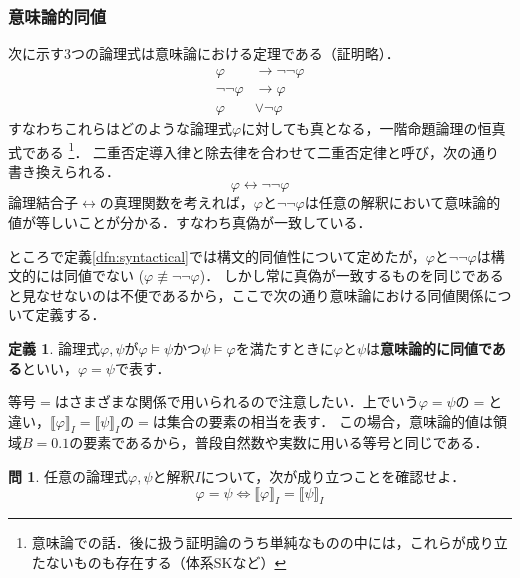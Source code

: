 \documentclass[uplatex,a4paper,dvipdfmx]{jsarticle}
\newcommand{\semvalue}[1]{\llbracket {#1} \rrbracket}
\theoremstyle{definition}
\newtheorem{dfn}{定義}
\newtheorem{question}{問}
\begin{document}
            \subsubsection{意味論的同値}
                次に示す3つの論理式は意味論における定理である（証明略）．
                \begin{align}
                    \varphi & \to  \lnot\lnot \varphi \tag{二重否定導入律} \\
                    \lnot\lnot\varphi &\to \varphi \tag{二重否定除去律} \\
                    \varphi &\lor \lnot\varphi \tag{排中律}
                \end{align}
                すなわちこれらはどのような論理式$\varphi$に対しても真となる，一階命題論理の恒真式である
                \footnote{意味論での話．後に扱う証明論のうち単純なものの中には，これらが成り立たないものも存在する（体系SKなど）}．
                二重否定導入律と除去律を合わせて二重否定律と呼び，次の通り書き換えられる．
                \begin{equation}
                    \varphi \leftrightarrow \lnot\lnot \varphi \tag{二重否定律}
                \end{equation}
                論理結合子$\leftrightarrow$の真理関数を考えれば，$\varphi$と$\lnot\lnot\varphi$は任意の解釈において意味論的値が等しいことが分かる．すなわち真偽が一致している．

                ところで定義\ref{dfn:syntactical}では構文的同値性について定めたが，$\varphi$と$\lnot\lnot\varphi$は構文的には同値でない ($\varphi \not\equiv \lnot\lnot \varphi$)．
                しかし常に真偽が一致するものを同じであると見なせないのは不便であるから，ここで次の通り意味論における同値関係について定義する．
                \begin{dfn}
                    論理式$\varphi, \psi$が$\varphi \vDash \psi$かつ$\psi \vDash \varphi$を満たすときに$\varphi$と$\psi$は\textbf{意味論的に同値である}といい，$\varphi = \psi$で表す．
                \end{dfn}

                等号$=$はさまざまな関係で用いられるので注意したい．上でいう$\varphi = \psi$の$=$と違い，$\semvalue{\varphi}_I = \semvalue{\psi}_I$の$=$は集合の要素の相当を表す．
                この場合，意味論的値は領域$B=\qty{0,1}$の要素であるから，普段自然数や実数に用いる等号と同じである．

                \begin{question}
                    任意の論理式$\varphi, \psi$と解釈$I$について，次が成り立つことを確認せよ．
                    \begin{equation*}
                        \varphi = \psi \Longleftrightarrow \semvalue{\varphi}_I = \semvalue{\psi}_I
                    \end{equation*}
                \end{question}
            
\end{document}
